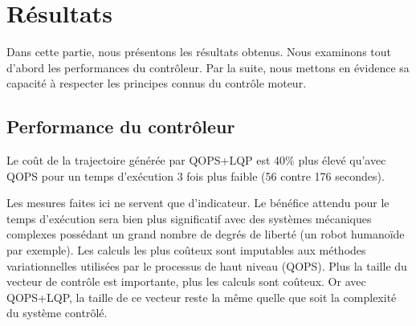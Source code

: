 \documentclass[pdftex,a4paper,11pt]{article}
\begin{document}

\section{Résultats}
\label{sec:results}

Dans cette partie, nous présentons les résultats obtenus. Nous examinons tout
d'abord les performances du contrôleur. Par la suite, nous mettons en évidence
sa capacité à respecter les principes connus du contrôle moteur.


\subsection{Performance du contrôleur}


Le coût de la trajectoire générée par QOPS+LQP est 40\% plus élevé qu'avec QOPS
pour un temps d'exécution 3 fois plus faible (56 contre 176 secondes).

Les mesures faites ici ne servent que d'indicateur.
Le bénéfice attendu pour le temps d'exécution sera bien plus significatif
avec des systèmes mé\-ca\-niques complexes possédant un grand nombre de 
degrés de liberté (un robot humanoïde par exemple).
Les calculs les plus coûteux sont imputables aux méthodes variationnelles
utilisées par le processus de haut niveau (QOPS).
Plus la taille du vecteur de contrôle est importante, plus les calculs sont coûteux.
Or avec QOPS+LQP, la taille de ce vecteur reste la même quelle que soit
la complexité du système contrôlé.
\end{document}
